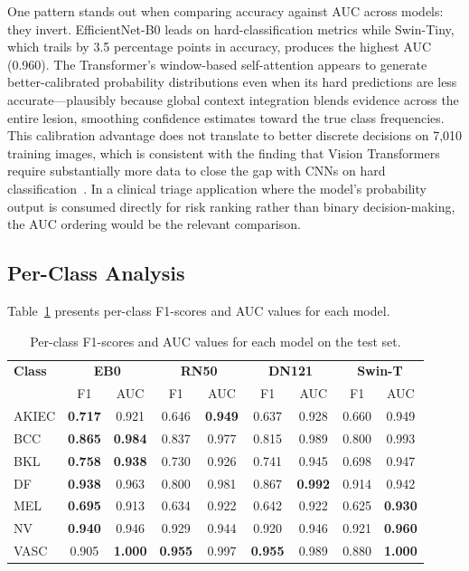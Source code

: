 One pattern stands out when comparing accuracy against AUC across models: they invert. EfficientNet-B0 leads on hard-classification metrics while Swin-Tiny, which trails by 3.5 percentage points in accuracy, produces the highest AUC (0.960). The Transformer's window-based self-attention appears to generate better-calibrated probability distributions even when its hard predictions are less accurate---plausibly because global context integration blends evidence across the entire lesion, smoothing confidence estimates toward the true class frequencies. This calibration advantage does not translate to better discrete decisions on 7,010 training images, which is consistent with the finding that Vision Transformers require substantially more data to close the gap with CNNs on hard classification~\cite{touvron2021deit}. In a clinical triage application where the model's probability output is consumed directly for risk ranking rather than binary decision-making, the AUC ordering would be the relevant comparison.

\subsection{Per-Class Analysis}

Table~\ref{tab:per_class_f1} presents per-class F1-scores and AUC values for each model.

\begin{table}[H]
\centering
\caption{Per-class F1-scores and AUC values for each model on the test set.}
\label{tab:per_class_f1}
\begin{tabular}{l|cc|cc|cc|cc}
\toprule
\textbf{Class} & \multicolumn{2}{c|}{\textbf{EB0}} & \multicolumn{2}{c|}{\textbf{RN50}} & \multicolumn{2}{c|}{\textbf{DN121}} & \multicolumn{2}{c}{\textbf{Swin-T}} \\
 & F1 & AUC & F1 & AUC & F1 & AUC & F1 & AUC \\
\midrule
AKIEC & \textbf{0.717} & 0.921 & 0.646 & \textbf{0.949} & 0.637 & 0.928 & 0.660 & 0.949 \\
BCC   & \textbf{0.865} & \textbf{0.984} & 0.837 & 0.977 & 0.815 & 0.989 & 0.800 & 0.993 \\
BKL   & \textbf{0.758} & \textbf{0.938} & 0.730 & 0.926 & 0.741 & 0.945 & 0.698 & 0.947 \\
DF    & \textbf{0.938} & 0.963 & 0.800 & 0.981 & 0.867 & \textbf{0.992} & 0.914 & 0.942 \\
MEL   & \textbf{0.695} & 0.913 & 0.634 & 0.922 & 0.642 & 0.922 & 0.625 & \textbf{0.930} \\
NV    & \textbf{0.940} & 0.946 & 0.929 & 0.944 & 0.920 & 0.946 & 0.921 & \textbf{0.960} \\
VASC  & 0.905 & \textbf{1.000} & \textbf{0.955} & 0.997 & \textbf{0.955} & 0.989 & 0.880 & \textbf{1.000} \\
\bottomrule
\end{tabular}
\end{table}

